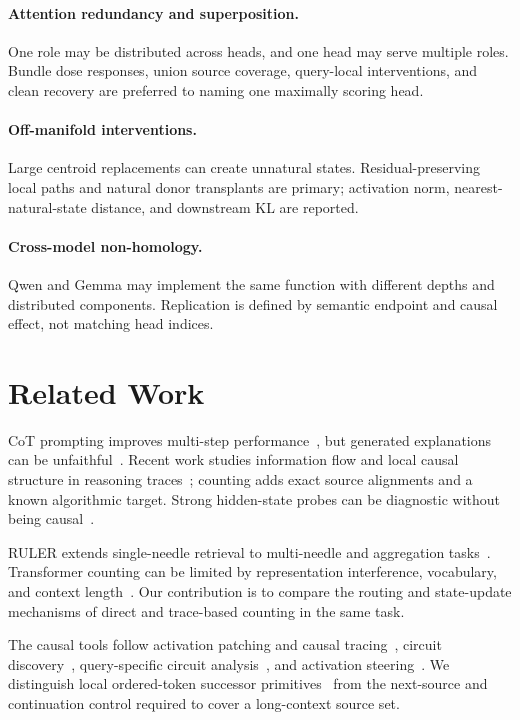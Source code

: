 \paragraph{Attention redundancy and superposition.}
One role may be distributed across heads, and one head may serve multiple roles. Bundle dose responses, union source coverage, query-local interventions, and clean recovery are preferred to naming one maximally scoring head.

\paragraph{Off-manifold interventions.}
Large centroid replacements can create unnatural states. Residual-preserving local paths and natural donor transplants are primary; activation norm, nearest-natural-state distance, and downstream KL are reported.

\paragraph{Cross-model non-homology.}
Qwen and Gemma may implement the same function with different depths and distributed components. Replication is defined by semantic endpoint and causal effect, not matching head indices.

\section{Related Work}

CoT prompting improves multi-step performance~\citep{wei2022cot}, but generated explanations can be unfaithful~\citep{turpin2023unfaithful}. Recent work studies information flow and local causal structure in reasoning traces~\citep{yang2026howcot,wei2026attricot}; counting adds exact source alignments and a known algorithmic target. Strong hidden-state probes can be diagnostic without being causal~\citep{yuan2026hidden}.

RULER extends single-needle retrieval to multi-needle and aggregation tasks~\citep{hsieh2024ruler}. Transformer counting can be limited by representation interference, vocabulary, and context length~\citep{yehudai2024count}. Our contribution is to compare the routing and state-update mechanisms of direct and trace-based counting in the same task.

The causal tools follow activation patching and causal tracing~\citep{meng2022rome}, circuit discovery~\citep{conmy2023acdc}, query-specific circuit analysis~\citep{wang2022ioi}, and activation steering~\citep{turner2023actadd}. We distinguish local ordered-token successor primitives~\citep{gould2023successor} from the next-source and continuation control required to cover a long-context source set.

